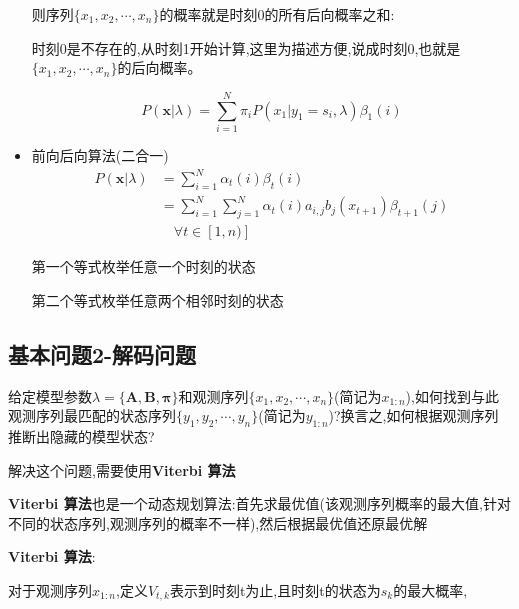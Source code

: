 \documentclass[UTF8,a4paper]{ctexart}%
\begin{document}
\begin{itemize}
                  则序列$\{x_1,x_2 , \cdots , x_n\}$的概率就是时刻$0$的所有后向概率之和:

                  {\color{blue}
                      时刻0是不存在的,从时刻1开始计算,这里为描述方便,说成时刻0,也就是
                      $\{x_{1},x_{2} , \cdots , x_n\}$的后向概率。
                  }

                  \begin{equation}
                    P(\bm{x}|\lambda) = \sum_{i = 1}^N \pi_iP(x_1|y_1 = s_i,\lambda)\beta_1(i)
                  \end{equation}

              \item 前向后向算法(二合一)
                  \begin{equation}\begin{split}
                    P(\bm{x}|\lambda) &= \sum_{i = 1}^N \alpha_t(i) \beta_t(i)\\
                    &= \sum_{i = 1}^N \sum_{j = 1}^N \alpha_t(i) a_{i,j} b_j(x_{t+1}) \beta_{t+1}(j) \\&\quad \forall t \in [1,n)]
                  \end{split}\end{equation}

                  {\color{blue}
                    第一个等式枚举任意一个时刻的状态

                    第二个等式枚举任意两个相邻时刻的状态
                  }
            \end{itemize}

        \subsection{基本问题2-解码问题}
            给定模型参数$\lambda = \{\bm{A,B,\pi}\}$和观测序列$\{x_1, x_2, \cdots , x_n\}$(简记为$x_{1:n}$),如何找到与此观测序列最匹配的状态序列$\{y_1,y_2 , \cdots , y_n\}$(简记为$y_{1:n}$)?换言之,如何根据观测序列推断出隐藏的模型状态?

            解决这个问题,需要使用\textbf{Viterbi 算法}

            {\color{blue}
            \textbf{Viterbi 算法}也是一个动态规划算法:首先求最优值(该观测序列概率的最大值,针对不同的状态序列,观测序列的概率不一样),然后根据最优值还原最优解
            }

            \textbf{Viterbi 算法}:

            对于观测序列$x_{1:n}$,定义$V_{t,k}$表示到时刻t为止,且时刻t的状态为$s_k$的最大概率,
\end{document}

